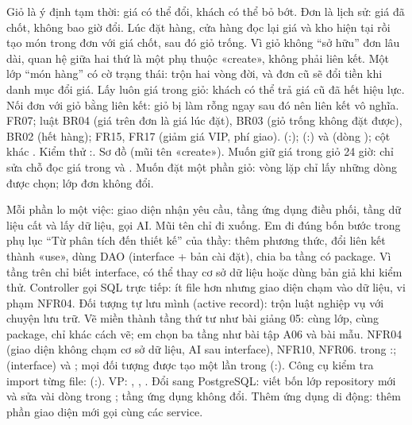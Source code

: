 {Giỏ là ý định tạm thời: giá có thể đổi, khách có thể bỏ bớt. Đơn là lịch sử: giá đã chốt, không bao giờ đổi. Lúc đặt hàng, cửa hàng đọc lại giá và kho hiện tại rồi tạo món trong đơn với giá chốt, sau đó giỏ trống. Vì giỏ không ``sở hữu'' đơn lâu dài, quan hệ giữa hai thứ là một phụ thuộc «create», không phải liên kết.}
{Một lớp ``món hàng'' có cờ trạng thái: trộn hai vòng đời, và đơn cũ sẽ đổi tiền khi danh mục đổi giá. Lấy luôn giá trong giỏ: khách có thể trả giá cũ đã hết hiệu lực. Nối đơn với giỏ bằng liên kết: giỏ bị làm rỗng ngay sau đó nên liên kết vô nghĩa.}
{FR07; luật BR04 (giá trên đơn là giá lúc đặt), BR03 (giỏ trống không đặt được), BR02 (hết hàng); FR15, FR17 (giảm giá VIP, phí giao).}
{ (:\dongFromCart);  (:\dongCheckout) và  (dòng \dongCurrentProduct); cột  khác . Kiểm thử :\dongTestFromCart. Sơ đồ  (mũi tên «create»).}
{Muốn giữ giá trong giỏ 24 giờ: chỉ sửa chỗ đọc giá trong  và . Muốn đặt một phần giỏ: vòng lặp chỉ lấy những dòng được chọn; lớp đơn không đổi.}

{Mỗi phần lo một việc: giao diện nhận yêu cầu, tầng ứng dụng điều phối, tầng dữ liệu cất và lấy dữ liệu, gọi AI. Mũi tên chỉ đi xuống. Em đi đúng bốn bước trong phụ lục ``Từ phân tích đến thiết kế'' của thầy: thêm phương thức, đổi liên kết thành «use», dùng DAO (interface + bản cài đặt), chia ba tầng có package. Vì tầng trên chỉ biết interface, có thể thay cơ sở dữ liệu hoặc dùng bản giả khi kiểm thử.}
{Controller gọi SQL trực tiếp: ít file hơn nhưng giao diện chạm vào dữ liệu, vi phạm NFR04. Đối tượng tự lưu mình (active record): trộn luật nghiệp vụ với chuyện lưu trữ. Vẽ miền thành tầng thứ tư như bài giảng 05: cùng lớp, cùng package, chỉ khác cách vẽ; em chọn ba tầng như bài tập A06 và bài mẫu.}
{NFR04 (giao diện không chạm cơ sở dữ liệu, AI sau interface), NFR10, NFR06.}
{ trong :\dongModelLayers;  (interface) và ; mọi đối tượng được tạo một lần trong  (:\dongMain). Công cụ kiểm tra import từng file:  (:\dongCheckDeps). VP: , , .}
{Đổi sang PostgreSQL: viết bốn lớp repository mới và sửa vài dòng trong ; tầng ứng dụng không đổi. Thêm ứng dụng di động: thêm phần giao diện mới gọi cùng các service.}

